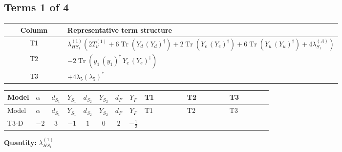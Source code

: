 \documentclass[8pt]{article}
\begin{document}
\begin{landscape}
\subsection*{Terms 1 of 4}
\begin{center}
\begin{tabular}{@{}c >{\raggedright\arraybackslash}p{0.82\linewidth}@{}}
\toprule
Column & Representative term structure \\
\midrule
T1 & \(\displaystyle {\lambda_{HS_1}^{(1)}} (2 T_{\nu}^{(1)}+6 \operatorname{Tr}\!\left({Y_d}\,\left({Y_d}\right)^{\dagger}\right)+2 \operatorname{Tr}\!\left({Y_e}\,\left({Y_e}\right)^{\dagger}\right)+6 \operatorname{Tr}\!\left({Y_u}\,\left({Y_u}\right)^{\dagger}\right)+4 {\lambda_{S_1}^{(A)}})\) \\
\midrule
T2 & \(\displaystyle -2 \operatorname{Tr}\!\left({y_1}\,\left({y_1}\right)^{\dagger}\,{Y_e}\,\left({Y_e}\right)^{\dagger}\right)\) \\
\midrule
T3 & \(\displaystyle +4 {\lambda_5} \left({\lambda_5}\right)^{*}\) \\
\midrule
\bottomrule
\end{tabular}
\end{center}
\smallskip
\tiny
\begin{longtable}{@{}llcccccc >{\raggedright\arraybackslash}p{0.21\linewidth} >{\raggedright\arraybackslash}p{0.21\linewidth} >{\raggedright\arraybackslash}p{0.21\linewidth}@{}}
\toprule
Model & $\alpha$ & $d_{S_1}$ & $Y_{S_1}$ & $d_{S_2}$ & $Y_{S_2}$ & $d_F$ & $Y_F$ & T1 & T2 & T3 \\
\midrule
\endfirsthead
\toprule
Model & $\alpha$ & $d_{S_1}$ & $Y_{S_1}$ & $d_{S_2}$ & $Y_{S_2}$ & $d_F$ & $Y_F$ & T1 & T2 & T3 \\
\midrule
\endhead
T3-D & $-2$ & $3$ & $-1$ & $1$ & $0$ & $2$ & $-\frac{1}{2}$ & \scriptsize\adjustbox{max width=\linewidth}{$\begin{gathered} {\lambda_{HS_1}^{(1)}} (2 T_{\nu}^{(1)}+6 \operatorname{Tr}\!\left({Y_d}\,\left({Y_d}\right)^{\dagger}\right)+2 \operatorname{Tr}\!\left({Y_e}\,\left({Y_e}\right)^{\dagger}\right)+6 \operatorname{Tr}\!\left({Y_u}\,\left({Y_u}\right)^{\dagger}\right)+4 {\lambda_{S_1}^{(A)}})\end{gathered}$} & \scriptsize\adjustbox{max width=\linewidth}{$\begin{gathered} -2 \operatorname{Tr}\!\left({y_1}\,\left({y_1}\right)^{\dagger}\,{Y_e}\,\left({Y_e}\right)^{\dagger}\right)\end{gathered}$} & \scriptsize\adjustbox{max width=\linewidth}{$\begin{gathered} +4 {\lambda_5} \left({\lambda_5}\right)^{*}\end{gathered}$} \\
\midrule
\bottomrule
\end{longtable}
\clearpage
\noindent\textbf{Quantity: }$\lambda_{HS_1}^{(1)}$\par\smallskip

\end{landscape}
\end{document}
